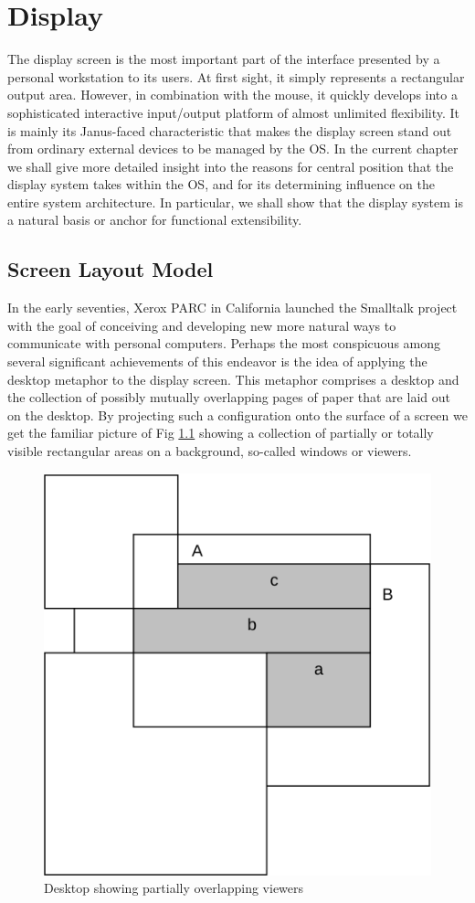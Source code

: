 \chapter{Display}
\label{ch:display}
The display screen is the most important part of the interface presented by a personal workstation
to its users. At first sight, it simply represents a rectangular output area. However, in combination
with the mouse, it quickly develops into a sophisticated interactive input/output platform of almost
unlimited flexibility. It is mainly its Janus-faced characteristic that makes the display screen stand
out from ordinary external devices to be managed by the OS. In the current chapter
we shall give more detailed insight into the reasons for central position that the display system
takes within the OS, and for its determining influence on the entire system architecture. In particular,
we shall show that the display system is a natural basis or anchor for functional extensibility.

\section{Screen Layout Model}
In the early seventies, Xerox PARC in California launched the Smalltalk project with the goal of
conceiving and developing new more natural ways to communicate with personal computers\cite{Goldberg}.
Perhaps the most conspicuous among several significant achievements of this endeavor is the idea of 
applying the desktop metaphor to the display screen. This metaphor comprises a desktop and the collection
of possibly mutually overlapping pages of paper that are laid out on the desktop. By projecting such a
configuration onto the surface of a screen we get the familiar picture of Fig \ref{fig:desktop} showing
a collection of partially or totally visible rectangular areas on a background, so-called windows or viewers.
\begin{figure}
	\centering
	\includegraphics[width=.6\textwidth]{i/4}
	\caption{Desktop showing partially overlapping viewers}
	\label{fig:desktop}
\end{figure}

